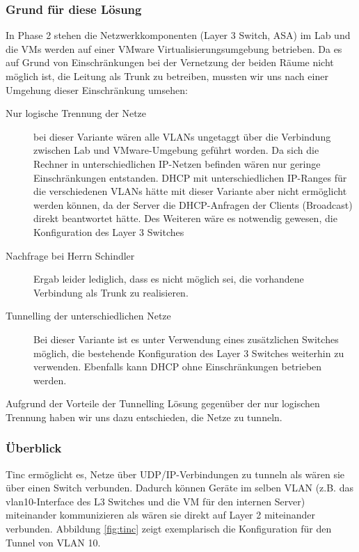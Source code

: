 \subsubsection{Grund für diese Lösung}
In Phase 2 stehen die Netzwerkkomponenten (Layer 3 Switch, ASA) im Lab und die VMs werden auf einer VMware Virtualisierungsumgebung betrieben. Da es auf Grund von Einschränkungen bei der Vernetzung der beiden Räume nicht möglich ist, die Leitung als Trunk zu betreiben, mussten wir uns nach einer Umgehung dieser Einschränkung umsehen:

\begin{description}
	\item[Nur logische Trennung der Netze] bei dieser Variante wären alle VLANs ungetaggt über die Verbindung zwischen Lab und VMware-Umgebung geführt worden. Da sich die Rechner in unterschiedlichen IP-Netzen befinden wären nur geringe Einschränkungen entstanden. DHCP mit unterschiedlichen IP-Ranges für die verschiedenen VLANs hätte mit dieser Variante aber nicht ermöglicht werden können, da der Server die DHCP-Anfragen der Clients (Broadcast) direkt beantwortet hätte.
	Des Weiteren wäre es notwendig gewesen, die Konfiguration des Layer 3 Switches 
	\item[Nachfrage bei Herrn Schindler] Ergab leider lediglich, dass es nicht möglich sei, die vorhandene Verbindung als Trunk zu realisieren.
	\item[Tunnelling der unterschiedlichen Netze] Bei dieser Variante ist es unter Verwendung eines zusätzlichen Switches möglich, die bestehende Konfiguration des Layer 3 Switches weiterhin zu verwenden. Ebenfalls kann DHCP ohne Einschränkungen betrieben werden.
\end{description}

Aufgrund der Vorteile der Tunnelling Lösung gegenüber der nur logischen Trennung haben wir uns dazu entschieden, die Netze zu tunneln.

\subsubsection{Überblick}
Tinc ermöglicht es, Netze über UDP/IP-Verbindungen zu tunneln als wären sie über einen Switch verbunden. Dadurch können Geräte im selben VLAN (z.B. das vlan10-Interface des L3 Switches und die VM für den internen Server) miteinander kommunizieren als wären sie direkt auf Layer 2 miteinander verbunden. Abbildung \ref{fig:tinc} zeigt exemplarisch die Konfiguration für den Tunnel von VLAN 10.

